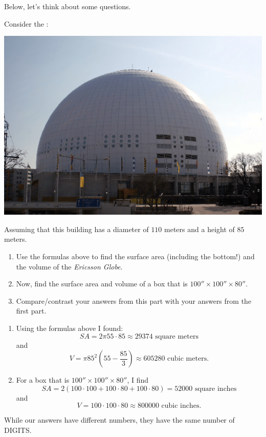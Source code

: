 \documentclass[handout,nooutcomes,noauthor]{ximera}
\begin{document}
Below, let's think about some questions. 


\mynewpage





\begin{question}
  Consider the :
   \begin{center}
    \includegraphics[width=.4\textwidth]{dome.png} %
   \end{center}
   Assuming that this building has a diameter of $110$ meters and a
   height of $85$ meters.
   \begin{enumerate}
   \item Use the formulas above to find the surface area (including
     the bottom!) and the volume of the \textit{Ericsson Globe}.
   \item Now, find the surface area and volume of a box that is
     $100''\times 100'' \times 80''$.
     \item Compare/contrast your answers from this part with your
       answers from the first part.
   \end{enumerate}
   \begin{freeResponse}
     \begin{enumerate}
     \item Using the formulas above I found:
       \[
       SA = 2\pi 55\cdot 85 \approx 29374 \text{ square meters}
       \]
       and
       \[
       V = \pi85^2 \left(55-\frac{85}{3}\right)\approx  605280 \text{ cubic meters}.
       \]
     \item For a box that is  $100''\times 100'' \times 80''$, I find
       \[
       SA = 2(100\cdot 100 + 100\cdot 80 + 100\cdot 80) = 52000 \text{ square inches}
       \]
       and
       \[
       V = 100\cdot 100\cdot 80 \approx 800000 \text{ cubic inches}.
       \]
     \end{enumerate}
     \item While our answers have different numbers, they have the same number of DIGITS.
   \end{freeResponse}
\end{question}
\mynewpage
\end{document}
